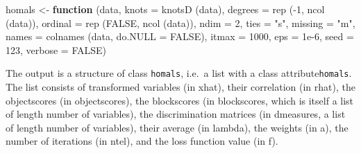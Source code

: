 \documentclass[
  12pt,
]{book}
\newenvironment{Shaded}{\begin{snugshade}}{\end{snugshade}}
\newcommand{\AttributeTok}[1]{\textcolor[rgb]{0.77,0.63,0.00}{#1}}
\newcommand{\ConstantTok}[1]{\textcolor[rgb]{0.00,0.00,0.00}{#1}}
\newcommand{\ControlFlowTok}[1]{\textcolor[rgb]{0.13,0.29,0.53}{\textbf{#1}}}
\newcommand{\DecValTok}[1]{\textcolor[rgb]{0.00,0.00,0.81}{#1}}
\newcommand{\FloatTok}[1]{\textcolor[rgb]{0.00,0.00,0.81}{#1}}
\newcommand{\FunctionTok}[1]{\textcolor[rgb]{0.00,0.00,0.00}{#1}}
\newcommand{\NormalTok}[1]{#1}
\newcommand{\OtherTok}[1]{\textcolor[rgb]{0.56,0.35,0.01}{#1}}
\newcommand{\SpecialCharTok}[1]{\textcolor[rgb]{0.00,0.00,0.00}{#1}}
\newcommand{\StringTok}[1]{\textcolor[rgb]{0.31,0.60,0.02}{#1}}
\begin{document}
\begin{Shaded}
\begin{Highlighting}[]
\NormalTok{homals }\OtherTok{\textless{}{-}}
  \ControlFlowTok{function}\NormalTok{ (data,}
            \AttributeTok{knots =} \FunctionTok{knotsD}\NormalTok{ (data),}
            \AttributeTok{degrees =} \FunctionTok{rep}\NormalTok{ (}\SpecialCharTok{{-}}\DecValTok{1}\NormalTok{, }\FunctionTok{ncol}\NormalTok{ (data)),}
            \AttributeTok{ordinal =} \FunctionTok{rep}\NormalTok{ (}\ConstantTok{FALSE}\NormalTok{, }\FunctionTok{ncol}\NormalTok{ (data)),}
            \AttributeTok{ndim =} \DecValTok{2}\NormalTok{,}
            \AttributeTok{ties =} \StringTok{"s"}\NormalTok{,}
            \AttributeTok{missing =} \StringTok{"m"}\NormalTok{,}
            \AttributeTok{names =} \FunctionTok{colnames}\NormalTok{ (data, }\AttributeTok{do.NULL =} \ConstantTok{FALSE}\NormalTok{),}
            \AttributeTok{itmax =} \DecValTok{1000}\NormalTok{,}
            \AttributeTok{eps =} \FloatTok{1e{-}6}\NormalTok{,}
            \AttributeTok{seed =} \DecValTok{123}\NormalTok{,}
            \AttributeTok{verbose =} \ConstantTok{FALSE}\NormalTok{)}
\end{Highlighting}
\end{Shaded}

The output is a structure of class \texttt{homals}, i.e.~a list with a class attribute\texttt{homals}. The list consists of transformed variables (in xhat), their correlation (in rhat), the objectscores (in objectscores), the blockscores (in blockscores, which is itself a list of length number of variables), the discrimination matrices (in dmeasures, a list of length number of variables), their average (in lambda), the weights (in a), the number of iterations (in ntel), and the loss function value (in f).

\begin{Shaded}
\end{Shaded}
\end{document}
